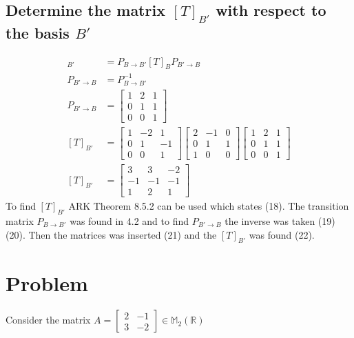 \documentclass[12pt, a4paper]{article}
\begin{document}
		\subsection{Determine the matrix $[T]_{B'}$ with respect to the basis $B'$}
			\begin{align}
			 [T]_{B'}&=P_{B\rightarrow B'}[T]_BP_{B'\rightarrow B}\\
			 P_{B'\rightarrow B}&=P_{B\rightarrow B'}^{-1}\\
			 P_{B'\rightarrow B}&=\begin{bmatrix}1&2&1\\0&1&1\\0&0&1\end{bmatrix}\\
			 [T]_{B'}&=\begin{bmatrix}1&-2&1\\0&1&-1\\0&0&1\end{bmatrix}\begin{bmatrix}2&-1&0\\0&1&1\\1&0&0\end{bmatrix}\begin{bmatrix}1&2&1\\0&1&1\\0&0&1\end{bmatrix}\\
			 [T]_{B'}&=\begin{bmatrix}3&3&-2\\-1&-1&-1\\1&2&1\end{bmatrix}
			\end{align}
			To find $[T]_{B'}$ ARK Theorem 8.5.2 can be used which states (18). The transition matrix $P_{B\rightarrow B'}$ was found in 4.2 and to find $P_{B'\rightarrow B}$ the inverse was taken (19) (20). Then the matrices was inserted (21) and the $[T]_{B'}$ was found (22).
	\section{Problem}
		Consider the matrix $A=\begin{bmatrix}2&-1\\3&-2\end{bmatrix}\in \mathbb{M}_2(\mathbb{R})$
\end{document}
